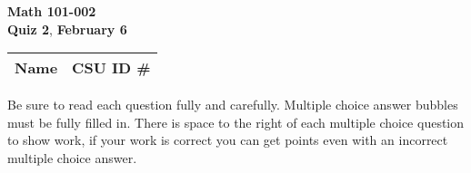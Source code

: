 \documentclass[12pt]{exam}
\newcommand{\class}{Math 101-002} %
\newcommand{\examnum}{Quiz 2} %
\newcommand{\examdate}{February 6} %
\begin{document}
\pagestyle{plain}
\thispagestyle{empty}

\noindent
\textbf{\class}\\
\textbf{\examnum}, \textbf{\examdate} \\



\setlength{\tabcolsep}{3.5cm} %
\renewcommand{\arraystretch}{1.5}
\setlength\extrarowheight{1cm}
\begin{tabular}{ |c|c| } 
 \hline
 Name   & CSU ID \#  \\ 
 \hline
\end{tabular}
\vspace{10pt}

Be sure to read each question fully and carefully. Multiple choice answer bubbles must be fully filled in.  There is space to the right of each multiple choice question to show work, if your work is correct you can get points even with an incorrect multiple choice answer.  


\iffalse

    \foreach \s in {1,...,5}{
          \choice $P_\s$ has no power 
     }%
\fi
\end{document}
